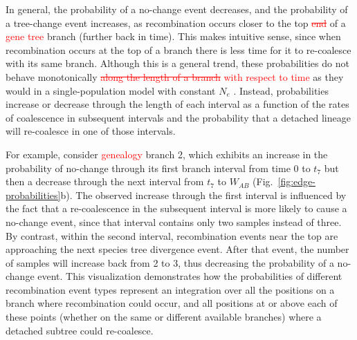 \documentclass[11pt]{article}
\begin{document}
In general, the probability of a no-change event decreases, and the probability
of a tree-change event increases, as recombination occurs closer to the top
\textcolor{red}{\sout{end}} of a \textcolor{red}{gene tree} branch (further back in time). 
This makes intuitive sense, since when 
recombination occurs at the top of a branch there is less time for it to re-coalesce 
with its same branch. Although this is a general trend, these probabilities do not 
behave monotonically \textcolor{red}{\sout{along the length of a branch} with respect
to time} as they would in a 
single-population model with constant $N_e$ \citep{deng_distribution_2021}.
Instead, probabilities increase or decrease through the length of each
interval as a function of the rates of coalescence in subsequent 
intervals and the probability that a detached lineage will 
re-coalesce in one of those intervals.

For example, consider \textcolor{red}{genealogy} branch 2, which exhibits an increase in the
probability of no-change through its first branch interval from time 0 to
$t_7$ but then a decrease through the next interval from $t_7$ to $W_{AB}$
(Fig.~\ref{fig:edge-probabilities}b).
The observed increase through the first interval is influenced by the fact that
a re-coalescence in the subsequent interval is more likely to cause a no-change
event, since that interval contains only two samples instead of three.
By contrast, within the second interval, recombination events near 
the top are approaching the next species tree divergence event. After that event, the 
number of samples will increase back from 2 to 3, 
thus decreasing the probability of a no-change event. 
This visualization demonstrates how the probabilities of different recombination 
event types represent an integration over all the positions on a branch where 
recombination could occur, and all positions at or above each of these points (whether on the 
same or different available branches) where a detached subtree could re-coalesce. 
\end{document}
